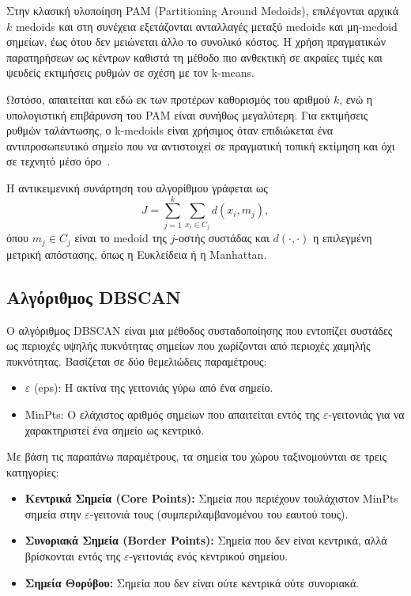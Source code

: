 Στην κλασική υλοποίηση PAM (Partitioning Around Medoids), επιλέγονται αρχικά $k$ medoids και στη συνέχεια εξετάζονται ανταλλαγές μεταξύ medoids και μη-medoid σημείων, έως ότου δεν μειώνεται άλλο το συνολικό κόστος. Η χρήση πραγματικών παρατηρήσεων ως κέντρων καθιστά τη μέθοδο πιο ανθεκτική σε ακραίες τιμές και ψευδείς εκτιμήσεις ρυθμών σε σχέση με τον k-means.

Ωστόσο, απαιτείται και εδώ εκ των προτέρων καθορισμός του αριθμού $k$, ενώ η υπολογιστική επιβάρυνση του PAM είναι συνήθως μεγαλύτερη. Για εκτιμήσεις ρυθμών ταλάντωσης, ο k-medoids είναι χρήσιμος όταν επιδιώκεται ένα αντιπροσωπευτικό σημείο που να αντιστοιχεί σε πραγματική τοπική εκτίμηση και όχι σε τεχνητό μέσο όρο~\cite{kaufman2009finding,kaufmann1987clustering}.

Η αντικειμενική συνάρτηση του αλγορίθμου γράφεται ως
\begin{equation}
J=\sum_{j=1}^{k}\sum_{x_i\in C_j} d(x_i,m_j),
\label{eq:kmedoids-objective}
\end{equation}
όπου $m_j\in C_j$ είναι το medoid της $j$-οστής συστάδας και $d(\cdot,\cdot)$ η επιλεγμένη μετρική απόστασης, όπως η Ευκλείδεια ή η Manhattan.

\subsection{Αλγόριθμος DBSCAN}

Ο αλγόριθμος DBSCAN είναι μια μέθοδος συσταδοποίησης που εντοπίζει συστάδες ως περιοχές υψηλής πυκνότητας σημείων που χωρίζονται από περιοχές χαμηλής πυκνότητας. Βασίζεται σε δύο θεμελιώδεις παραμέτρους:

\begin{itemize}
    \item $\varepsilon$ (eps): Η ακτίνα της γειτονιάς γύρω από ένα σημείο.

    \item MinPts: Ο ελάχιστος αριθμός σημείων που απαιτείται εντός της $\varepsilon$-γειτονιάς για να χαρακτηριστεί ένα σημείο ως κεντρικό.
\end{itemize}

Με βάση τις παραπάνω παραμέτρους, τα σημεία του χώρου ταξινομούνται σε τρεις κατηγορίες:

\begin{itemize}
    \item \textbf{Κεντρικά Σημεία (Core Points):} Σημεία που περιέχουν τουλάχιστον MinPts σημεία στην $\varepsilon$-γειτονιά τους (συμπεριλαμβανομένου του εαυτού τους).

    \item \textbf{Συνοριακά Σημεία (Border Points):} Σημεία που δεν είναι κεντρικά, αλλά βρίσκονται εντός της $\varepsilon$-γειτονιάς ενός κεντρικού σημείου.

    \item \textbf{Σημεία Θορύβου:} Σημεία που δεν είναι ούτε κεντρικά ούτε συνοριακά.
\end{itemize}

